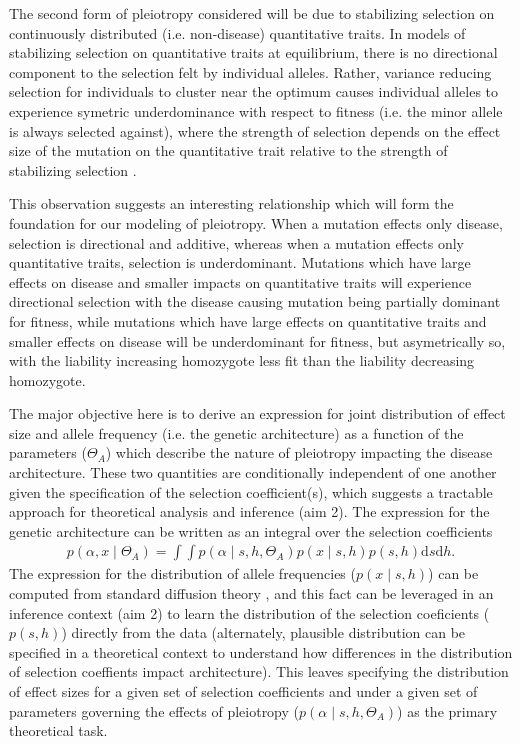 \documentclass[11pt]{article}
\begin{document}
The second form of pleiotropy considered will be due to stabilizing selection on continuously distributed (i.e. non-disease) quantitative traits. In models of stabilizing selection on quantitative traits at equilibrium, there is no directional component to the selection felt by individual alleles. Rather, variance reducing selection for individuals to cluster near the optimum causes individual alleles to experience symetric underdominance with respect to fitness (i.e. the minor allele is always selected against), where the strength of selection depends on the effect size of the mutation on the quantitative trait relative to the strength of stabilizing selection \cite{Robertson:1956dk}.

This observation suggests an interesting relationship which will form the foundation for our modeling of pleiotropy. When a mutation effects only disease, selection is directional and additive, whereas when a mutation effects only quantitative traits, selection is underdominant. Mutations which have large effects on disease and smaller impacts on quantitative traits will experience directional selection with the disease causing mutation being partially dominant for fitness, while mutations which have large effects on quantitative traits and smaller effects on disease will be underdominant for fitness, but asymetrically so, with the liability increasing homozygote less fit than the liability decreasing homozygote.

The major objective here is to derive an expression for joint distribution of effect size and allele frequency (i.e. the genetic architecture) as a function of the parameters ($\Theta_A$) which describe the nature of pleiotropy impacting the disease architecture. These two quantities are conditionally independent of one another given the specification of the selection coefficient(s), which suggests a tractable approach for theoretical analysis and inference (aim 2). The expression for the genetic architecture can be written as an integral over the selection coefficients
\begin{align}
  p\left(\alpha,x \mid \Theta_A\right) = \int \int p\left(\alpha \mid s,h,\Theta_A\right) p\left(x \mid s,h \right) p\left(s,h\right)\mathrm{d}s \mathrm{d}h.
\end{align}
The expression for the distribution of allele frequencies ($p\left(x \mid s,h\right)$) can be computed from standard diffusion theory \cite{Ewens}, and this fact can be leveraged in an inference context (aim 2) to learn the distribution of the selection coeficients ($p\left(s,h\right)$) directly from the data (alternately, plausible distribution can be specified in a theoretical context to understand how differences in the distribution of selection coeffients impact architecture). This leaves specifying the distribution of effect sizes for a given set of selection coefficients and under a given set of parameters governing the effects of pleiotropy ($p\left(\alpha \mid s,h,\Theta_A\right)$) as the primary theoretical task.
\end{document}
